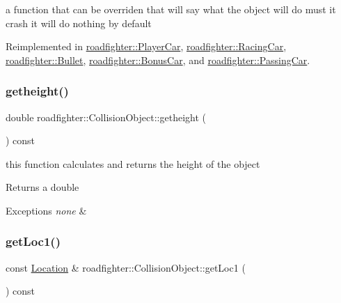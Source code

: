 a function that can be overriden that will say what the object will do must it crash it will do nothing by default 

Reimplemented in \hyperlink{classroadfighter_1_1PlayerCar_a330d071af729d7afbfcfd7ef92516544}{roadfighter\+::\+Player\+Car}, \hyperlink{classroadfighter_1_1RacingCar_a2f5018f17852d75682afd78e806b8e4c}{roadfighter\+::\+Racing\+Car}, \hyperlink{classroadfighter_1_1Bullet_ac96121377fffa9ed8ea94c333a841a7a}{roadfighter\+::\+Bullet}, \hyperlink{classroadfighter_1_1BonusCar_aad0a2a41a1b84c6487c1fc204b5f7cb7}{roadfighter\+::\+Bonus\+Car}, and \hyperlink{classroadfighter_1_1PassingCar_a5c437fb5164d2735881a469650db048d}{roadfighter\+::\+Passing\+Car}.

\mbox{\label{classroadfighter_1_1CollisionObject_a0c83b40afb7be4ed3b501a79c2a81b9b}} 
\subsubsection{\texorpdfstring{getheight()}{getheight()}}
{\footnotesize\ttfamily double roadfighter\+::\+Collision\+Object\+::getheight (\begin{DoxyParamCaption}{ }\end{DoxyParamCaption}) const}

this function calculates and returns the height of the object \begin{DoxyReturn}{Returns}
a double 
\end{DoxyReturn}

\begin{DoxyExceptions}{Exceptions}
{\em none} & \\
\hline
\end{DoxyExceptions}
\mbox{\label{classroadfighter_1_1CollisionObject_a73baa1faea7a399a944e6a6f1d04ad86}} 
\subsubsection{\texorpdfstring{get\+Loc1()}{getLoc1()}}
{\footnotesize\ttfamily const \hyperlink{classroadfighter_1_1Location}{Location} \& roadfighter\+::\+Collision\+Object\+::get\+Loc1 (\begin{DoxyParamCaption}{ }\end{DoxyParamCaption}) const}

